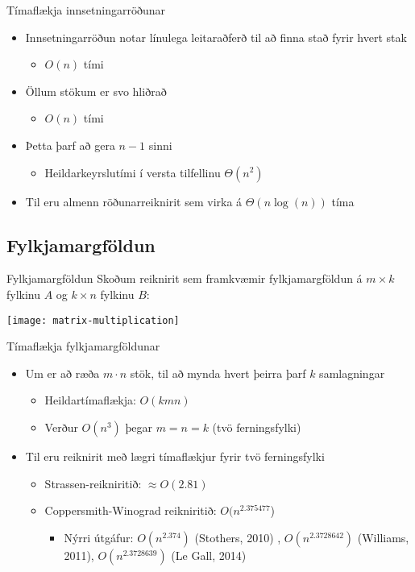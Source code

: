 \documentclass[handout]{beamer}
\begin{document}
\begin{frame}{Tímaflækja innsetningarröðunar}
\begin{itemize}
 \item Innsetningarröðun notar línulega leitaraðferð til að finna stað fyrir hvert stak \pause
 \begin{itemize}
  \item $O(n)$ tími
 \end{itemize}
 \item Öllum stökum er svo hliðrað \pause
 \begin{itemize}
  \item $O(n)$ tími
 \end{itemize}
 \item Þetta þarf að gera $n-1$ sinni
 \begin{itemize}
  \item Heildarkeyrslutími í versta tilfellinu $\Theta(n^2)$
 \end{itemize}
 \item Til eru almenn röðunarreiknirit sem virka á $\Theta(n\log(n))$ tíma
\end{itemize}
\end{frame}

\subsection{Fylkjamargföldun}

\begin{frame}{Fylkjamargföldun}
Skoðum reiknirit sem framkvæmir fylkjamargföldun á $m \times k$ fylkinu $A$ og $k \times n$ fylkinu $B$:
\begin{center}
\texttt{[image: matrix-multiplication]}
\end{center}
\end{frame}

\begin{frame}{Tímaflækja fylkjamargföldunar}
\begin{itemize}
 \item Um er að ræða $m \cdot n$ stök, til að mynda hvert þeirra þarf $k$ samlagningar \pause
 \begin{itemize}
  \item Heildartímaflækja: $O(kmn)$
  \item Verður $O(n^3)$ þegar $m = n = k$ (tvö ferningsfylki)
 \end{itemize}\pause
 \item Til eru reiknirit með lægri tímaflækjur fyrir tvö ferningsfylki
 \begin{itemize}
  \item Strassen-reikniritið: $\approx O(2.81)$
  \item Coppersmith-Winograd reikniritið: $O(n^{2.375477}$)
  \begin{itemize}
   \item Nýrri útgáfur: $O(n^{2.374})$ (Stothers, 2010) \pause, $O(n^{2.3728642})$ (Williams, 2011), \pause $O(n^{2.3728639})$ (Le Gall, 2014)
  \end{itemize}
 \end{itemize}
\end{itemize}
\end{frame}
\end{document}

